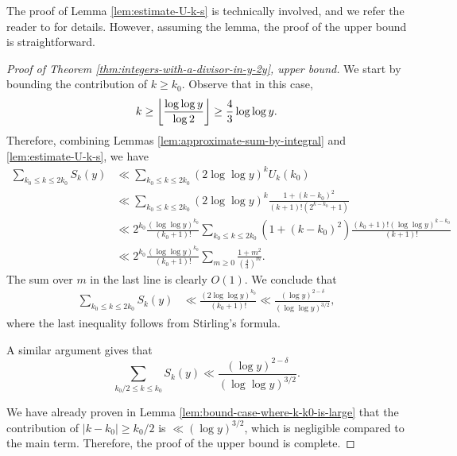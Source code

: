 The proof of Lemma \ref{lem:estimate-U-k-s} is technically involved, and we refer the reader to \cite{integerswithadivisor} for details.
However, assuming the lemma, the proof of the upper bound is straightforward. 
\begin{proof}[Proof of Theorem \ref{thm:integers-with-a-divisor-in-y-2y}, upper bound]
    We start by bounding the contribution of $k \ge k_0$. Observe that in this case,
    \begin{equation*}
        k \ge \left\lfloor\frac{\log \log y}{\log 2} \right\rfloor \ge \frac{4}{3} \log \log y.
    \end{equation*}
    Therefore, combining Lemmas \ref{lem:approximate-sum-by-integral} and \ref{lem:estimate-U-k-s}, we have
    \begin{align*}
        \sum \limits_{k_0 \le k \le 2k_0} S_k(y) &\ll \sum \limits_{k_0 \le k \le 2k_0} (2 \log \log y)^k U_k (k_0) \\
        &\ll \sum \limits_{k_0 \le k \le 2k_0} (2\log \log y)^k \frac{1 + (k - k_0)^2}{(k + 1)! (2^{k - k_0} + 1)} \\ 
        &\ll 2^{k_0} \frac{(\log \log y)^{k_0}}{(k_0 + 1)!} \sum \limits_{k_0 \le k \le 2k_0} \left(1 + (k - k_0)^2 \right) \frac{(k_0 + 1)!(\log \log y)^{k-k_0}}{(k + 1)!} \\
        & \ll 2^{k_0} \frac{(\log \log y)^{k_0}}{(k_0 + 1)!} \sum \limits_{m \ge 0} \frac{1 + m^2}{\left( \frac{4}{3} \right)^m}.
    \end{align*}
    The sum over $m$ in the last line is clearly $O(1)$.
    We conclude that
    \begin{align*}
        \sum \limits_{k_0 \le k \le 2k_0} S_k(y) &\ll \frac{(2 \log \log y)^{k_0}}{(k_0 + 1)!} \ll \frac{(\log y)^{2 - \delta}}{(\log \log y)^{3/2}},
    \end{align*}
    where the last inequality follows from Stirling's formula.

    A similar argument gives that
    \begin{equation*}
        \sum \limits_{k_0/2 \le k \le k_0} S_k(y) \ll\frac{(\log y)^{2 - \delta}}{(\log \log y)^{3/2}}.
    \end{equation*}

    We have already proven in Lemma \ref{lem:bound-case-where-k-k0-is-large} that the contribution of $\left|k - k_0\right| \ge k_0 / 2$ is $\ll (\log y)^{3/2}$, which is negligible compared to the main term. 
    Therefore, the proof of the upper bound is complete.
\end{proof}
